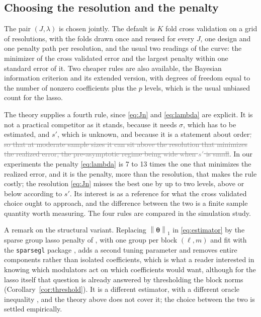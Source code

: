 \documentclass[12pt]{article} %
\theoremstyle{definition}
\newcommand{\norm}[1]{\left\lVert #1 \right\rVert}
\newcommand{\cv}{\ell}
\newcommand{\md}{m}
\newcommand{\btheta}{\boldsymbol{\theta}}
\newcommand{\pen}{\lambda}
\newcommand{\seff}{s'}
\begin{document}
\subsection{Choosing the resolution and the penalty}
\label{sec:tuning}

The pair $(J,\pen)$ is chosen jointly. The default is $K$ fold cross
validation on a grid of resolutions, with the folds drawn once and reused for
every $J$, one design and one penalty path per resolution, and the usual two
readings of the curve: the minimizer of the cross validated error and the
largest penalty within one standard error of it. Two cheaper rules are also
available, the Bayesian information criterion and its extended version, with
degrees of freedom equal to the number of nonzero coefficients plus the $p$
levels, which is the usual unbiased count for the lasso.

The theory supplies a fourth rule, since \eqref{eq:Jn} and \eqref{eq:lambda}
are explicit. It is not a practical competitor as it stands, because it needs
$\sigma$, which has to be estimated, and $\seff$, which is unknown, and
because it is a statement about order\textcolor{gray}{\sout{, so that at moderate sample sizes it can
sit above the resolution that minimizes the realized error, the pre-asymptotic
regime being wide when $\seff$ is small}}\textcolor{colR1}{. In our experiments the penalty
\eqref{eq:lambda} is 7 to 13 times the one that minimizes the realized error,
and it is the penalty, more than the resolution, that makes the rule costly;
the resolution \eqref{eq:Jn} misses the best one by up to two levels, above
or below according to $\seff$}.
Its interest is as a reference for
what the cross validated choice ought to approach, and the difference between
the two is a finite sample quantity worth measuring. The four rules are
compared in the simulation study.

A remark on the structural variant. Replacing $\norm{\btheta}_1$ in
\eqref{eq:estimator} by the sparse group lasso penalty of
\citet{Simon-Friedman-Hastie-Tibshirani-2013}, with one group per block
$(\cv,\md)$\textcolor{colR1}{ and fit with the \texttt{sparsegl} package
\citep{Liang-Cohen-SolonHeinsfeld-Pestilli-McDonald-2024}}, adds a second tuning parameter and removes entire components
rather than isolated coefficients, which is what a reader interested in
knowing which modulators act on which coefficients would want\textcolor{colR1}{, although for
the lasso itself that question is already answered by thresholding the block
norms (Corollary~\ref{cor:threshold})}. It is a
different estimator, with a different oracle inequality
\citep{Lounici-Pontil-vandeGeer-Tsybakov-2011}, and the theory above does not
cover it; the choice between the two is settled empirically.
\end{document}
